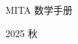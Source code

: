 


\begin{center}
	\vspace*{\fill}
	\Logo
	\titlefontE
	\par\Huge MITA 数学手册
	\par\Large 2025 秋
	\vspace*{\fill}
\end{center}

\newpage
